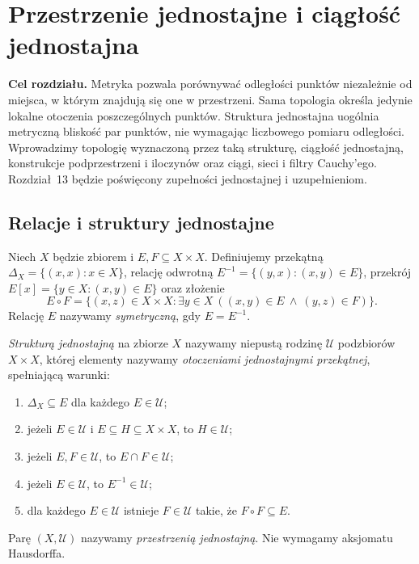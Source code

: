 \chapter{Przestrzenie jednostajne i ciągłość jednostajna}
\label{ch:topog-przestrzenie-jednostajne}

\noindent\textbf{Cel rozdziału.}
Metryka pozwala porównywać odległości punktów niezależnie od miejsca,
w którym znajdują się one w przestrzeni. Sama topologia określa
jedynie lokalne otoczenia poszczególnych punktów. Struktura jednostajna
uogólnia metryczną bliskość par punktów, nie wymagając liczbowego
pomiaru odległości. Wprowadzimy topologię wyznaczoną przez taką
strukturę, ciągłość jednostajną, konstrukcje podprzestrzeni i iloczynów
oraz ciągi, sieci i filtry Cauchy'ego. Rozdział~13 będzie poświęcony
zupełności jednostajnej i uzupełnieniom.

\section{Relacje i struktury jednostajne}
\label{sec:topog-jednostajne-definicje}

\begin{definicja}
\label{def:topog-jednostajne-relacje}
Niech $X$ będzie zbiorem i $E,F\subseteq X\times X$.
Definiujemy przekątną $\Delta_X=\{(x,x):x\in X\}$,
relację odwrotną $E^{-1}=\{(y,x):(x,y)\in E\}$,
przekrój $E[x]=\{y\in X:(x,y)\in E\}$ oraz złożenie
\[
 E\circ F=\{(x,z)\in X\times X:
  \exists y\in X\ ((x,y)\in E\ \land\ (y,z)\in F)\}.
\]
Relację $E$ nazywamy \emph{symetryczną}, gdy $E=E^{-1}$.
\end{definicja}

\begin{definicja}
\label{def:topog-jednostajne-struktura}
\emph{Strukturą jednostajną} na zbiorze $X$ nazywamy
niepustą rodzinę $\mathcal U$ podzbiorów $X\times X$,
której elementy nazywamy \emph{otoczeniami jednostajnymi
przekątnej}, spełniającą warunki:
\begin{enumerate}[label=(\roman*)]
\item $\Delta_X\subseteq E$ dla każdego $E\in\mathcal U$;
\item jeżeli $E\in\mathcal U$ i $E\subseteq H\subseteq X\times X$,
      to $H\in\mathcal U$;
\item jeżeli $E,F\in\mathcal U$, to $E\cap F\in\mathcal U$;
\item jeżeli $E\in\mathcal U$, to $E^{-1}\in\mathcal U$;
\item dla każdego $E\in\mathcal U$ istnieje $F\in\mathcal U$
      takie, że $F\circ F\subseteq E$.
\end{enumerate}
Parę $(X,\mathcal U)$ nazywamy \emph{przestrzenią jednostajną}.
Nie wymagamy aksjomatu Hausdorffa.
\end{definicja}

